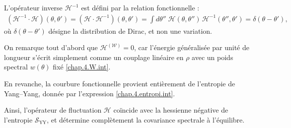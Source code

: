 \medskip


L’opérateur inverse \(\mathcal{H}^{-1}\) est défini par la relation fonctionnelle :
\begin{eqnarray}
	(\mathcal{H}^{-1} \cdot \mathcal{H})(\theta, \theta') = (\mathcal{H} \cdot \mathcal{H}^{-1})(\theta, \theta') = \int d\theta'' \; \mathcal{H}(\theta, \theta'')\, \mathcal{H}^{-1}(\theta'', \theta') = \delta(\theta - \theta'),
	\label{chap:fluctu:eq:hessienner.prod.inv} 	
\end{eqnarray}
où \(\delta(\theta - \theta')\) désigne la distribution de Dirac, et non une variation.

\medskip

On remarque tout d’abord que \(\mathcal{H}^{(\mathcal{W})} = 0\), car l’énergie généralisée par unité de longueur s’écrit simplement comme un couplage linéaire en \(\rho\)
avec un poids spectral \(w(\theta)\) fixé \eqref{chap.4.W.int}.%

\medskip

En revanche, la courbure fonctionnelle provient entièrement de l'entropie de Yang–Yang, donnée par l’expression \eqref{chap.4.entropi.int}.

\medskip

Ainsi, l’opérateur de fluctuation \(\mathcal{H}\) coïncide avec la hessienne négative de l'entropie \(\mathcal{S}_{\mathrm{YY}}\), et détermine complètement la covariance spectrale à l’équilibre.


